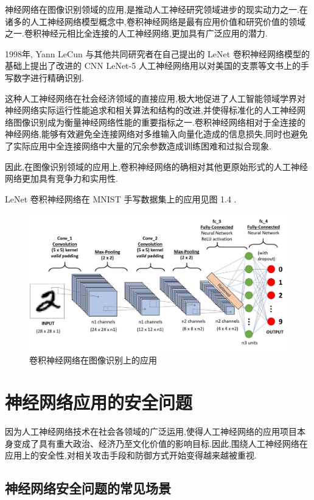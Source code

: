 神经网络在图像识别领域的应用,是推动人工神经研究领域进步的现实动力之一.在诸多的人工神经网络模型概念中,卷积神经网络是最有应用价值和研究价值的领域之一.卷积神经元相比全连接的人工神经网络,更加具有广泛应用的潜力.

1998年, Yann LeCun 与其他共同研究者在自己提出的 LeNet 卷积神经网络模型的基础上提出了改进的 CNN LeNet-5 人工神经网络用以对美国的支票等文书上的手写数字进行精确识别.

这种人工神经网络在社会经济领域的直接应用,极大地促进了人工智能领域学界对神经网络实际运行性能追求和相关算法和结构的改进,并使得标准化的人工神经网络图像识别成为衡量神经网络性能的重要指标之一.卷积神经网络相对于全连接的神经网络,能够有效避免全连接网络对多维输入向量化造成的信息损失,同时也避免了实际应用中全连接网络中大量的冗余参数造成训练困难和过拟合现象.

因此,在图像识别领域的应用上,卷积神经网络的确相对其他更原始形式的人工神经网络更加具有竞争力和实用性.

LeNet 卷积神经网络在 MNIST 手写数据集上的应用见图 1.4 .

\begin{figure}
	\centering
	\includegraphics[scale=0.2]{Figures/CNN2.jpg}
	\caption{卷积神经网络在图像识别上的应用}
\end{figure}

\chapter{神经网络应用的安全问题}

因为人工神经网络技术在社会各领域的广泛运用,使得人工神经网络的应用项目本身变成了具有重大政治、经济乃至文化价值的影响目标.因此,围绕人工神经网络在应用上的安全性,对相关攻击手段和防御方式开始变得越来越被重视.

\section{神经网络安全问题的常见场景}


